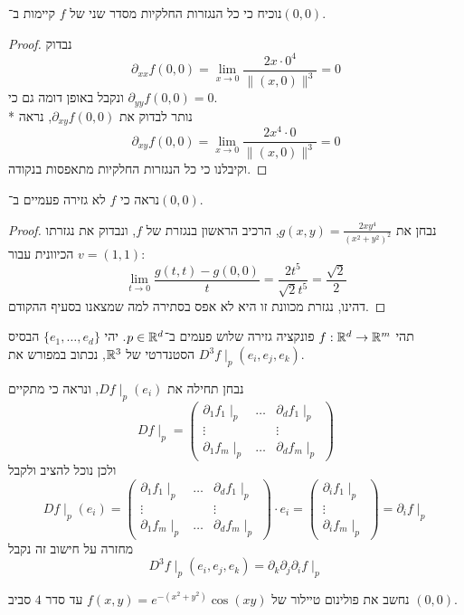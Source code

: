 \Subquestion{}
נוכיח כי כל הנגזרות החלקיות מסדר שני של $f$ קיימות ב־$(0, 0)$.
\begin{proof}
	נבדוק
	\[
		\partial_{xx} f(0, 0)
		= \lim_{x \to 0} \frac{2x \cdot 0^4}{\lVert (x, 0) \rVert^3}
		= 0
	\]
	ונקבל באופן דומה גם כי $\partial_{yy} f (0, 0) = 0$. \\*
	נותר לבדוק את $\partial_{xy} f(0, 0)$, נראה
	\[
		\partial_{xy} f(0, 0)
		= \lim_{x \to 0} \frac{2 x^4 \cdot 0}{\lVert (x, 0) \rVert^3}
		= 0
	\]
	וקיבלנו כי כל הנגזרות החלקיות מתאפסות בנקודה.
\end{proof}

\Subquestion{}
נראה כי $f$ לא גזירה פעמיים ב־$(0, 0)$.
\begin{proof}
	נבחן את $g(x, y) = \frac{2xy^4}{{(x^2 + y^2)}^2}$, הרכיב הראשון בנגזרת של $f$, ונבדוק את נגזרתו הכיוונית עבור $v = (1, 1)$:
	\[
		\lim_{t \to 0} \frac{g(t, t) - g(0, 0)}{t} = \frac{2t^5}{\sqrt{2} t^5} = \frac{\sqrt{2}}{2}
	\]
	דהינו, נגזרת מכוונת זו היא לא אפס בסתירה למה שמצאנו בסעיף ההקודם.
\end{proof}

\Question{}
תהי $f : \mathbb{R}^d \to \mathbb{R}^m$ פונקציה גזירה שלוש פעמים ב־$p \in \mathbb{R}^d$. יהי $\{e_1, \dots, e_d\}$ הבסיס הסטנדרטי של $\mathbb{R}^3$, נכתוב במפורש את $D^3 f\mid_p (e_i, e_j, e_k)$.

נבחן תחילה את $Df\mid_p(e_i)$, ונראה כי מתקיים
\[
	Df\mid_p =
	\begin{pmatrix}
		\partial_1 f_1 \mid_p & \hdots & \partial_d f_1 \mid_p \\
		\vdots & & \vdots \\
		\partial_1 f_m \mid_p & \hdots & \partial_d f_m \mid_p
	\end{pmatrix}
\]
ולכן נוכל להציב ולקבל
\[
	Df\mid_p(e_i) =
	\begin{pmatrix}
		\partial_1 f_1 \mid_p & \hdots & \partial_d f_1 \mid_p \\
		\vdots & & \vdots \\
		\partial_1 f_m \mid_p & \hdots & \partial_d f_m \mid_p
	\end{pmatrix}
	\cdot
	e_i
	=
	\begin{pmatrix}
		\partial_i f_1 \mid_p \\
		\vdots \\
		\partial_i f_m \mid_p
	\end{pmatrix}
	= \partial_i f\mid_p
\]
מחזרה על חישוב זה נקבל
\[
	D^3f \mid_p (e_i, e_j, e_k) = \partial_k \partial_j \partial_i f \mid_p
\]

\Question{}
\Subquestion{}
נחשב את פולינום טיילור של $f(x, y) = e^{-(x^2 + y^2)} \cos(xy)$ עד סדר $4$ סביב $(0, 0)$.


